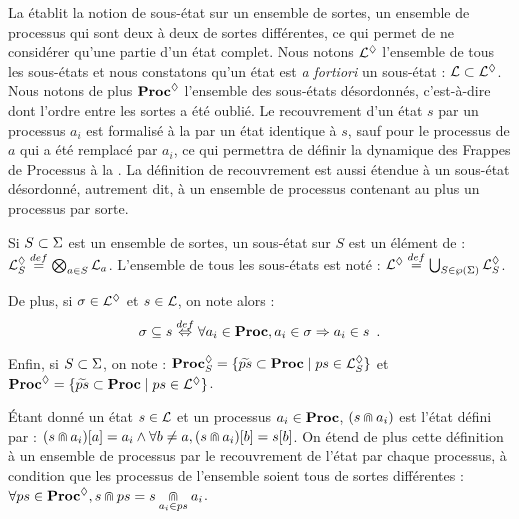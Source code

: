 La  établit la notion de sous-état sur un ensemble de sortes,
\cad un ensemble de processus qui sont deux à deux de sortes différentes,
ce qui permet de ne considérer qu'une partie d'un état complet.
Nous notons $\PHsubl$ l'ensemble de tous les sous-états et nous constatons qu'un
état est \textit{a fortiori} un sous-état : $\PHl \subset \PHsubl$.
Nous notons de plus $\PHsublset$ l'ensemble des sous-états désordonnés,
c'est-à-dire dont l'ordre entre les sortes a été oublié.
Le recouvrement d'un état $s$ par un processus $a_i$ est formalisé à la 
par un état identique à $s$, sauf pour le processus de $a$ qui a été remplacé par $a_i$,
ce qui permettra de définir la dynamique des Frappes de Processus %
à la .
La définition de recouvrement est aussi étendue à un sous-état désordonné,
autrement dit, à un ensemble de processus contenant au plus un processus par sorte.

\begin{definition}
  Si $S \subset \PHs$ est un ensemble de sortes, un sous-état sur $S$ est un élément de :
  $\PHsubl[\PHl]_S \DEF \bigtimes{a \in S} \PHl_a$.
  L'ensemble de tous les sous-états est noté :
  $\PHsubl[\PHl] \DEF \bigcup_{S \in\powerset(\PHs)} \PHsubl[\PHl]_S$.
  
  \noindent
  De plus, si $\mysigma \in \PHsubl[\PHl]$ et $s \in \PHl$, on note alors :
  \[\mysigma \subseteq s \EQDEF \forall a_i \in \Proc, a_i \in \mysigma \Rightarrow a_i \in s
    \enspace.\]
  
  \noindent
  Enfin, si $S \subset \PHs$, on note :
  $\PHsublset_S = \{ \toset{ps} \subset \Proc \mid ps \in \PHsubl_S \}$
  et
  $\PHsublset = \{ \toset{ps} \subset \Proc \mid ps \in \PHsubl \}$.
\end{definition}
%
\begin{definition}
  Étant donné un état $s \in \PHl$ et un processus $a_i \in \PHproc$,
  $(s \recouvre a_i)$ est l'état défini par :
  $\PHget{(s \recouvre a_i)}{a} = a_i \wedge
    \forall b \neq a, \PHget{(s \recouvre a_i)}{b} = \PHget{s}{b}$.
  On étend de plus cette définition à un ensemble de processus
  par le recouvrement de l'état par chaque processus,
  à condition que les processus de l'ensemble soient tous de sortes différentes :
  $\forall ps \in \PHsublset, s \recouvre ps = s \underset{a_i \in ps}{\recouvre} a_i$.
\end{definition}

